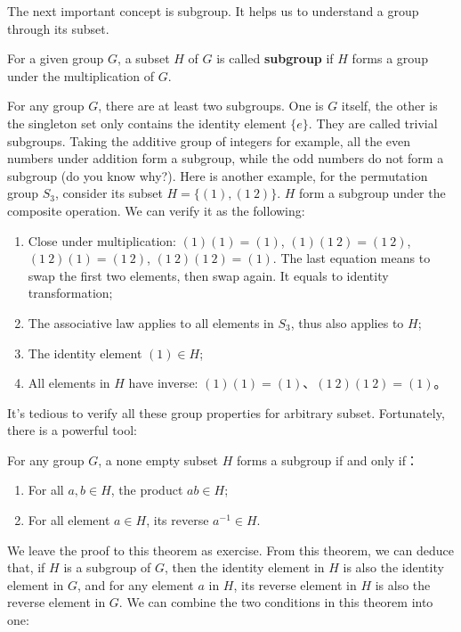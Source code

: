 \documentclass[b5paper]{article}
\begin{document}
The next important concept is subgroup. It helps us to understand a group through its subset.

\begin{definition}
For a given group $G$, a subset $H$ of $G$ is called \textbf{subgroup} if $H$ forms a group under the multiplication of $G$.
\end{definition}

For any group $G$, there are at least two subgroups. One is $G$ itself, the other is the singleton set only contains the identity element $\{e\}$. They are called trivial subgroups. Taking the additive group of integers for example, all the even numbers under addition form a subgroup, while the odd numbers do not form a subgroup (do you know why?). Here is another example, for the permutation group $S_3$, consider its subset $H = \{(1), (1\ 2)\}$. $H$ form a subgroup under the composite operation. We can verify it as the following:

\begin{enumerate}
\item Close under multiplication: $(1)(1) = (1)$, $(1)(1\ 2) = (1\ 2)$, $(1\ 2)(1) = (1\ 2)$, $(1\ 2) (1\ 2) = (1)$. The last equation means to swap the first two elements, then swap again. It equals to identity transformation;
\item The associative law applies to all elements in $S_3$, thus also applies to $H$;
\item The identity element $(1) \in H$;
\item All elements in $H$ have inverse: $(1)(1) = (1)$、$(1\ 2) (1\ 2) = (1)$。
\end{enumerate}

It's tedious to verify all these group properties for arbitrary subset. Fortunately, there is a powerful tool:

\begin{theorem}
For any group $G$, a none empty subset $H$ forms a subgroup if and only if：
\begin{enumerate}
\item For all $a, b \in H$, the product $ab \in H$;
\item For all element $a \in H$, its reverse $a^{-1} \in H$.
\end{enumerate}
\label{theorem:subgroup}
\end{theorem}

We leave the proof to this theorem as exercise. From this theorem, we can deduce that, if $H$ is a subgroup of $G$, then the identity element in $H$ is also the identity element in $G$, and for any element $a$ in $H$, its reverse element in $H$ is also the reverse element in $G$. We can combine the two conditions in this theorem into one:
\end{document}
